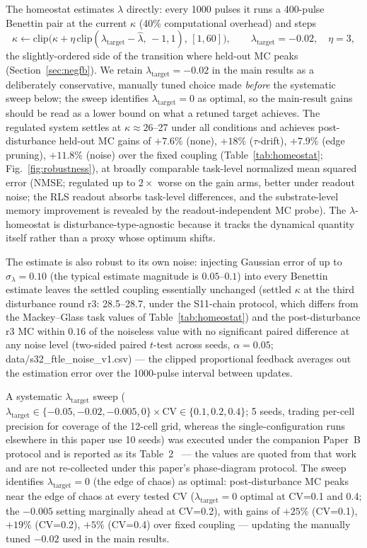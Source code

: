 \documentclass[11pt]{article}
\begin{document}
The homeostat estimates $\lambda$ directly: every 1000 pulses it runs a
400-pulse Benettin pair at the current $\kappa$ (40\% computational overhead)
and steps
\begin{equation}
\kappa \leftarrow \mathrm{clip}\big(\kappa + \eta\,\mathrm{clip}
(\lambda_{\mathrm{target}} - \hat\lambda,\, -1, 1),\, [1,60]\big),
\qquad \lambda_{\mathrm{target}} = -0.02, \quad \eta = 3,
\label{eq:homeostat}
\end{equation}
the slightly-ordered side of the transition where held-out MC peaks
(Section~\ref{sec:negfb}). We retain $\lambda_{\mathrm{target}}=-0.02$ in the
main results as a deliberately conservative, manually tuned choice made
\emph{before} the systematic sweep below; the sweep identifies
$\lambda_{\mathrm{target}}=0$ as optimal, so the main-result gains should be
read as a lower bound on what a retuned target achieves. The regulated system settles at $\kappa \approx
26$--27 under all conditions and achieves post-disturbance held-out MC gains of
$+7.6\%$ (none), $+18\%$ ($\tau$-drift), $+7.9\%$ (edge pruning), $+11.8\%$
(noise) over the fixed coupling (Table~\ref{tab:homeostat};
Fig.~\ref{fig:robustness}), at broadly
comparable task-level normalized mean squared error (NMSE; regulated up to $2\times$ worse on the gain arms,
better under readout noise; the RLS readout absorbs task-level differences,
and the substrate-level memory improvement is revealed by the
readout-independent MC probe). The
$\lambda$-homeostat is disturbance-type-agnostic because it tracks the
dynamical quantity itself rather than a proxy whose optimum shifts.

The estimate is also robust to its own noise: injecting Gaussian error
of up to $\sigma_\lambda = 0.10$ (the typical estimate magnitude is
$0.05$--$0.1$) into every Benettin estimate leaves the settled coupling
essentially unchanged (settled $\kappa$ at the third disturbance round r3:
28.5--28.7, under the S11-chain protocol, which differs from the Mackey--Glass
task values of Table~\ref{tab:homeostat}) and the post-disturbance
r3 MC within $0.16$ of the noiseless value with no significant paired
difference at any noise level (two-sided paired $t$-test across seeds,
$\alpha=0.05$; data/s32\_ftle\_noise\_v1.csv) --- the
clipped proportional feedback averages out the estimation error over the
1000-pulse interval between updates.

A systematic $\lambda_{\mathrm{target}}$ sweep
($\lambda_{\mathrm{target}}\in\{-0.05,-0.02,-0.005,0\}\times\mathrm{CV}\in\{0.1,0.2,0.4\}$;
5 seeds, trading per-cell precision for coverage of the 12-cell grid,
whereas the single-configuration runs elsewhere in this paper use 10 seeds)
was executed under the companion Paper~B protocol and is reported as its
Table~2~\cite{companionB} --- the values are quoted from that work and are
not re-collected under this paper's phase-diagram protocol. The sweep
identifies $\lambda_{\mathrm{target}}{=}0$
(the edge of chaos) as optimal: post-disturbance MC peaks near the edge of
chaos at every tested CV ($\lambda_{\mathrm{target}}{=}0$ optimal at CV=0.1 and 0.4;
the $-0.005$ setting marginally ahead at CV=0.2), with gains of $+25\%$
(CV=0.1), $+19\%$ (CV=0.2), $+5\%$ (CV=0.4) over fixed coupling --- updating
the manually tuned $-0.02$ used in the main results.
\end{document}
